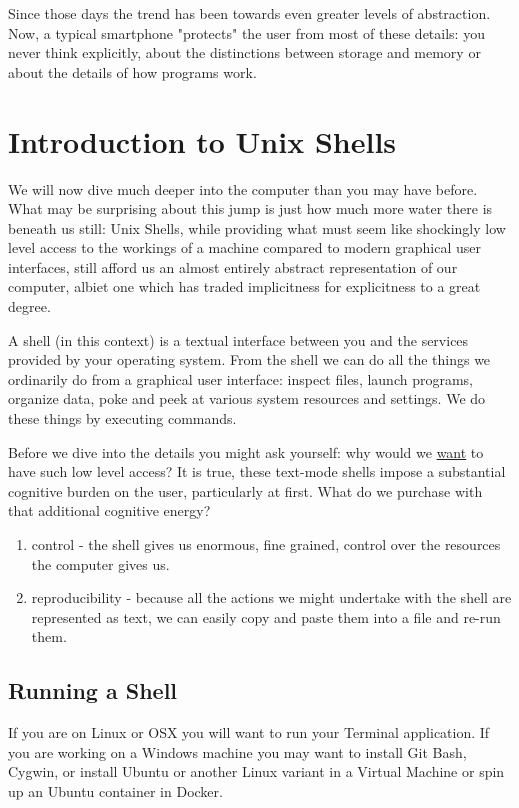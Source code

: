 \documentclass[11pt]{article}
\begin{document}
Since those days the trend has been towards even greater levels of
abstraction.  Now, a typical smartphone "protects" the user from most
of these details: you never think explicitly, about the distinctions
between storage and memory or about the details of how programs work.

\section{Introduction to Unix Shells}
\label{sec:org72de1f5}

We will now dive much deeper into the computer than you may have
before. What may be surprising about this jump is just how much more
water there is beneath us still: Unix Shells, while providing what
must seem like shockingly low level access to the workings of a
machine compared to modern graphical user interfaces, still afford us
an almost entirely abstract representation of our computer, albiet one
which has traded implicitness for explicitness to a great degree.

A shell (in this context) is a textual interface between you and the
services provided by your operating system. From the shell we can do
all the things we ordinarily do from a graphical user interface:
inspect files, launch programs, organize data, poke and peek at
various system resources and settings. We do these things by executing
commands.

Before we dive into the details you might ask yourself: why would we
\uline{want} to have such low level access? It is true, these text-mode
shells impose a substantial cognitive burden on the user, particularly
at first. What do we purchase with that additional cognitive energy?

\begin{enumerate}
\item control - the shell gives us enormous, fine grained, control over
the resources the computer gives us.
\item reproducibility - because all the actions we might undertake with
the shell are represented as text, we can easily copy and paste
them into a file and re-run them.
\end{enumerate}

\subsection{Running a Shell}
\label{sec:org3787738}

If you are on Linux or OSX you will want to run your Terminal
application. If you are working on a Windows machine you may want to
install Git Bash, Cygwin, or install Ubuntu or another Linux variant
in a Virtual Machine or spin up an Ubuntu container in Docker.
\end{document}

